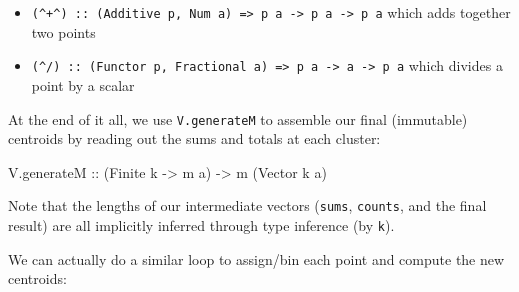 \documentclass[]{article}
\newenvironment{Shaded}{}{}
\newcommand{\DataTypeTok}[1]{\textcolor[rgb]{0.56,0.13,0.00}{#1}}
\newcommand{\NormalTok}[1]{#1}
\newcommand{\OtherTok}[1]{\textcolor[rgb]{0.00,0.44,0.13}{#1}}
\begin{document}
\begin{itemize}
\tightlist
\item
  \texttt{(\^{}+\^{})\ ::\ (Additive\ p,\ Num\ a)\ =\textgreater{}\ p\ a\ -\textgreater{}\ p\ a\ -\textgreater{}\ p\ a}
  which adds together two points
\item
  \texttt{(\^{}/)\ ::\ (Functor\ p,\ Fractional\ a)\ =\textgreater{}\ p\ a\ -\textgreater{}\ a\ -\textgreater{}\ p\ a}
  which divides a point by a scalar
\end{itemize}

At the end of it all, we use \texttt{V.generateM} to assemble our final
(immutable) centroids by reading out the sums and totals at each cluster:

\begin{Shaded}
\begin{Highlighting}[]
\NormalTok{V.generateM}\OtherTok{ ::}\NormalTok{ (}\DataTypeTok{Finite}\NormalTok{ k }\OtherTok{{-}\textgreater{}}\NormalTok{ m a) }\OtherTok{{-}\textgreater{}}\NormalTok{ m (}\DataTypeTok{Vector}\NormalTok{ k a)}
\end{Highlighting}
\end{Shaded}

Note that the lengths of our intermediate vectors (\texttt{sums},
\texttt{counts}, and the final result) are all implicitly inferred through type
inference (by \texttt{k}).

We can actually do a similar loop to assign/bin each point and compute the new
centroids:
\end{document}
